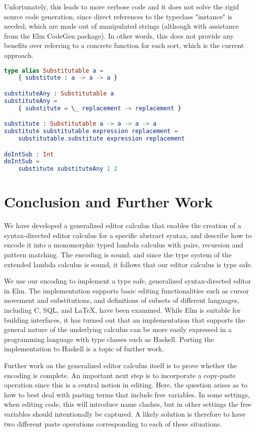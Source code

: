 \documentclass[sigplan]{acmart}
\begin{document}
Unfortunately, this leads to more verbose code and it does not solve the rigid source code generation, since direct references to the typeclass "instance" is needed, which are made out of manipulated strings (although with assistance from the Elm CodeGen package). In other words, this
does not provide any benefits over referring to a concrete function for
each sort, which is the current approach.

\begin{lstlisting}[language=elm,style=inline,caption={Elm typeclass simulation example},label={lst:elm-typeclass}]
type alias Substitutable a =
    { substitute : a -> a -> a }

substituteAny : Substitutable a
substituteAny =
    { substitute = \_ replacement -> replacement }

substitute : Substitutable a -> a -> a -> a
substitute substitutable expression replacement =
    substitutable.substitute expression replacement

doIntSub : Int
doIntSub =
    substitute substituteAny 1 2
\end{lstlisting}


\section{Conclusion and Further Work}

We have developed a generalized editor calculus that enables the
creation of a syntax-directed editor calculus for a specific abstract
syntax, and describe how to encode it into a monomorphic typed lambda
calculus with pairs, recursion and pattern matching. The encoding is
sound, and since the type system of the
extended lambda calculus is sound, it follows that our editor calculus
is type safe.

We use our encoding to implement a type safe, generalized
syntax-directed editor in Elm.  The implementation supports basic editing
functionalities such as cursor movement and substitutions, and
definitions of subsets of different languages, including C, SQL, and
\LaTeX, have been examined. While Elm is suitable for building
interfaces, it has turned out that an implementation that supports the
general nature of the underlying calculus can be more easily expressed
in a programming language with type classes such as Haskell. Porting
the implementation to Haskell is a topic of further work.

Further work on the generalized editor calculus itself is to prove whether
the encoding is complete.  An important next step is to
incorporate a copy-paste operation since this is a central notion in
editing. Here, the question arises as to how to best deal with pasting
terms that include free variables. In some settings, when editing
code, this will introduce name clashes, but in other settings the free
variables should intentionally be captured. A likely solution is
therefore to have two different paste operations corresponding to each
of these situations.


\balance

\end{document}
